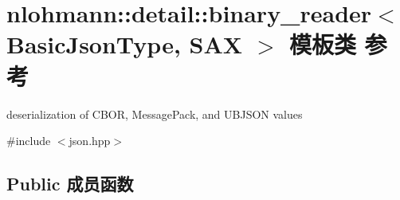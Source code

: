 \hypertarget{classnlohmann_1_1detail_1_1binary__reader}{}\section{nlohmann\+::detail\+::binary\+\_\+reader$<$ Basic\+Json\+Type, S\+AX $>$ 模板类 参考}
\label{classnlohmann_1_1detail_1_1binary__reader}


deserialization of C\+B\+OR, Message\+Pack, and U\+B\+J\+S\+ON values  




{\ttfamily \#include $<$json.\+hpp$>$}

\subsection*{Public 成员函数}
